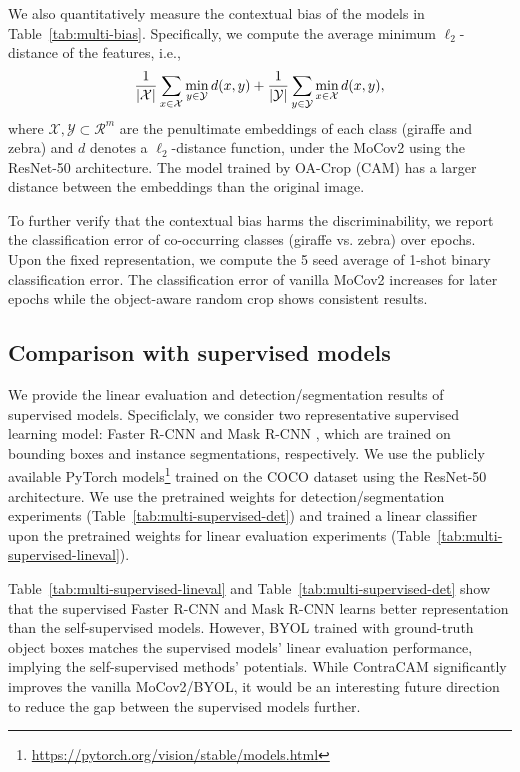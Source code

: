 We also quantitatively measure the contextual bias of the models in Table~\ref{tab:multi-bias}. Specifically, we compute the average minimum $\ell_2$-distance of the features, i.e.,
\begin{align}
    \frac{1}{\left\lvert\mathcal{X}\right\rvert} \sum_{x \in \mathcal{X}} \min_{y \in \mathcal{Y}} d(x,y)
    + \frac{1}{\left\lvert\mathcal{Y}\right\rvert} \sum_{y \in \mathcal{Y}} \min_{x \in \mathcal{X}} d(x,y),
\end{align}
where $\mathcal{X},\mathcal{Y} \subset \mathcal{R}^m$ are the penultimate embeddings of each class (giraffe and zebra) and $d$ denotes a $\ell_2$-distance function, under the MoCov2 using the ResNet-50 architecture. The model trained by OA-Crop (CAM) has a larger distance between the embeddings than the original image.




To further verify that the contextual bias harms the discriminability, we report the classification error of co-occurring classes (giraffe vs. zebra) over epochs. Upon the fixed representation, we compute the 5 seed average of 1-shot binary classification error. The classification error of vanilla MoCov2 increases for later epochs while the object-aware random crop shows consistent results.




\newpage
\subsection{Comparison with supervised models}
\label{sec:add-multi-supervised}

We provide the linear evaluation and detection/segmentation results of supervised models. Specificlaly, we consider two representative supervised learning model: Faster R-CNN \citep{ren2015faster} and Mask R-CNN \citep{he2017mask}, which are trained on bounding boxes and instance segmentations, respectively. We use the publicly available PyTorch models\footnote{\url{https://pytorch.org/vision/stable/models.html}} trained on the COCO dataset using the ResNet-50 architecture. We use the pretrained weights for detection/segmentation experiments (Table~\ref{tab:multi-supervised-det}) and trained a linear classifier upon the pretrained weights for linear evaluation experiments (Table~\ref{tab:multi-supervised-lineval}).

Table~\ref{tab:multi-supervised-lineval} and Table~\ref{tab:multi-supervised-det} show that the supervised Faster R-CNN and Mask R-CNN learns better representation than the self-supervised models. However, BYOL trained with ground-truth object boxes matches the supervised models' linear evaluation performance, implying the self-supervised methods' potentials. While ContraCAM significantly improves the vanilla MoCov2/BYOL, it would be an interesting future direction to reduce the gap between the supervised models further.

